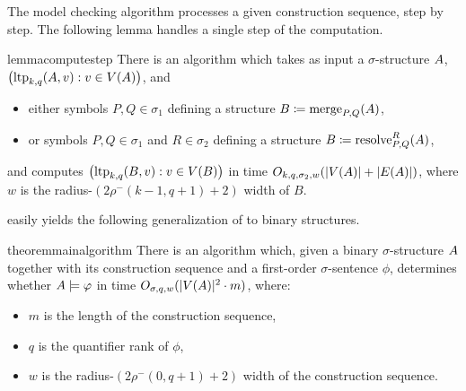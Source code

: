 The model checking algorithm processes a given construction sequence, step by step.
The following lemma handles a single step of the computation.

\begin{restatable}{lemma}{computestep}\label{lem:local-type-resolve-merge}
    There is an algorithm which takes as input
    a $\sigma$-structure ${{A}}$, \(\bigl(\textnormal{ltp}_{k,q}({{A}}, v):v\in V({{A}})\bigr)\), and
    \begin{itemize}
        \item either symbols \(P,Q \in \sigma_1\) defining a structure \({{B}} \coloneqq \mathrm{merge}_{P,Q}({{A}})\),
        \item or symbols \(P,Q \in \sigma_1\) and \(R \in \sigma_2\) defining a structure \({{B}} \coloneqq \mathrm{resolve}^{R}_{P,Q}({{A}})\),
    \end{itemize}
    and computes
    $\bigl(\textnormal{ltp}_{k,q}({{B}}, v):v\in V({{B}})\bigr)$
    in time $O_{k,q,\sigma_2,w}(|V({{A}})|+|E({{A}})|)$,
    where \(w\) is the radius-\((2\rho^-(k-1,q+1)+2)\) width of \(B\).
\end{restatable}


 easily yields the following generalization of  to binary structures.

\begin{restatable}{theorem}{mainalgorithm}\label{thm:main-algorithm}
There is an algorithm which,
given a binary $\sigma$-structure ${{A}}$ together
 with its construction sequence
 and a first-order $\sigma$-sentence $\phi$,
 determines whether ${{A}}\models \varphi$
in time
 $O_{\sigma,q,w}(|V({{A}})|^2 \cdot m)$,
 where:
    \begin{itemize}
        \item $m$ is the length of the construction sequence,
        \item $q$ is the quantifier rank of $\phi$,
        \item $w$ is the radius-\((2\rho^-(0,q+1)+2)\) width of the construction sequence.
    \end{itemize}
\end{restatable}


